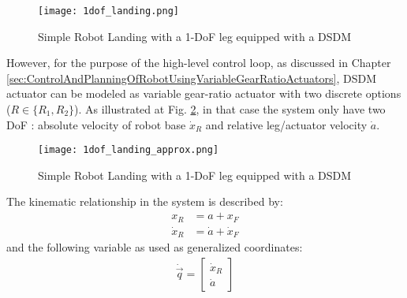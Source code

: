\begin{figure}[htp]
	\centering
		\texttt{[image: 1dof\_landing.png]}
	\caption{Simple Robot Landing with a 1-DoF leg equipped with a DSDM}
	\label{fig:1dof_landing}
\end{figure}

However, for the purpose of the high-level control loop, as discussed in Chapter \ref{sec:ControlAndPlanningOfRobotUsingVariableGearRatioActuators}, DSDM actuator can be modeled as variable gear-ratio actuator with two discrete options ($R \in \{R_1,R_2\}$). As illustrated at Fig. \ref{fig:1dof_landing_approx}, in that case the system only have two DoF : absolute velocity of robot base $\dot{x}_R$ and relative leg/actuator velocity $\dot{a}$.

\begin{figure}[htp]
	\centering
		\texttt{[image: 1dof\_landing\_approx.png]}
	\caption{Simple Robot Landing with a 1-DoF leg equipped with a DSDM}
	\label{fig:1dof_landing_approx}
\end{figure}


The kinematic relationship in the system is described by:
%
\begin{align}
 x_R &= a + x_F \\
 \dot{x}_R &= \dot{a} + \dot{x}_F 
\end{align}
%
and the following variable as used as generalized coordinates:
%
\begin{align}
\dot{\vec{q}} = 
\left[ \begin{array}{c}
\dot{x}_R \\ \dot{a}
\end{array} \right] 
\end{align}


